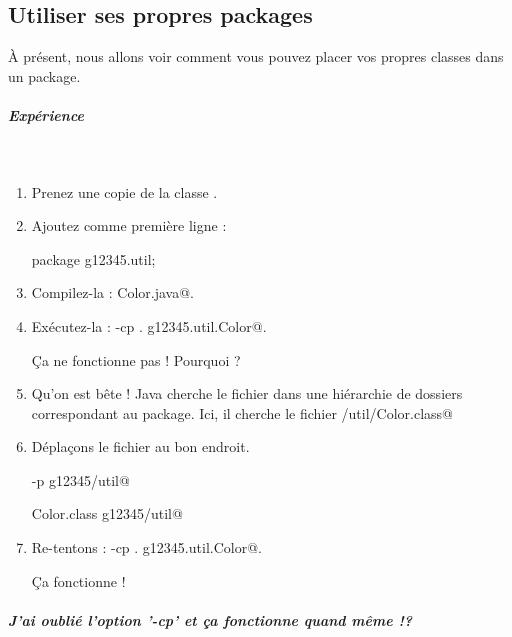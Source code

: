 \documentclass[11pt,a4paper]{article}
\begin{document}
            \par
        \subsection{Utiliser ses propres packages}
			\`A pr\'esent, 
			nous allons voir comment vous pouvez placer
			vos propres classes dans un package.
		
            \par
        
			
		\subparagraph{Exp\'erience} 
		
					\textcolor{white}{.} \par
				
            \par
        
					\begin{enumerate}
				
			\item 
				Prenez une copie de la classe 
				\verb@Color@.	
			
			\item 
				Ajoutez comme premi\`ere ligne :
				\begin{Java}
	package g12345.util;
				\end{Java}
			\item 
				Compilez-la : \verb@javac Color.java@.
			
			\item 
				Ex\'ecutez-la : \verb@java -cp . g12345.util.Color@.
				\par
				
				\c Ca ne fonctionne pas ! Pourquoi ?
			
			\item 
				Qu'on est b\^ete !
				Java cherche le fichier dans une hi\'erarchie
				de dossiers correspondant au package.
				Ici, il cherche le fichier
				/util/Color.class@
			\item 
				D\'epla\c cons le fichier au bon endroit.
				\par
				\verb@mkdir -p g12345/util@\par
				\verb@mv Color.class g12345/util@
			\item 
				Re-tentons : \verb@java -cp . g12345.util.Color@.
				\par
				
				\c Ca fonctionne !
			
					\end{enumerate}
				
			
		\subparagraph{J'ai oubli\'e l'option '-cp' et \c ca fonctionne quand m\^eme !?} 
		
\end{document}
